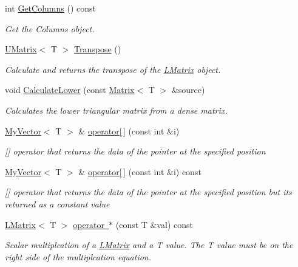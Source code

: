 \begin{DoxyCompactItemize}
int \mbox{\hyperlink{class_l_matrix_ae7adc0f92e3648751fe49852ad158ea2}{Get\+Columns}} () const
\begin{DoxyCompactList}\small\item\em Get the Columns object. \end{DoxyCompactList}\item 
\mbox{\hyperlink{class_u_matrix}{U\+Matrix}}$<$ T $>$ \mbox{\hyperlink{class_l_matrix_afe89d1c0c91d284ff0277da586dc667a}{Transpose}} ()
\begin{DoxyCompactList}\small\item\em Calculate and returns the transpose of the \mbox{\hyperlink{class_l_matrix}{L\+Matrix}} object. \end{DoxyCompactList}\item 
void \mbox{\hyperlink{class_l_matrix_a9a70080e771867dd76c983fe1f8c2c15}{Calculate\+Lower}} (const \mbox{\hyperlink{class_matrix}{Matrix}}$<$ T $>$ \&source)
\begin{DoxyCompactList}\small\item\em Calculates the lower triangular matrix from a dense matrix. \end{DoxyCompactList}\item 
\mbox{\hyperlink{class_my_vector}{My\+Vector}}$<$ T $>$ \& \mbox{\hyperlink{class_l_matrix_a7eab2a6c57437448d21a04484844e359}{operator\mbox{[}$\,$\mbox{]}}} (const int \&i)
\begin{DoxyCompactList}\small\item\em \mbox{[}\mbox{]} operator that returns the data of the pointer at the specified position \end{DoxyCompactList}\item 
\mbox{\hyperlink{class_my_vector}{My\+Vector}}$<$ T $>$ \& \mbox{\hyperlink{class_l_matrix_a56ec5ba9be0bb900ddc0ee7c5283bccd}{operator\mbox{[}$\,$\mbox{]}}} (const int \&i) const
\begin{DoxyCompactList}\small\item\em \mbox{[}\mbox{]} operator that returns the data of the pointer at the specified position but its returned as a constant value \end{DoxyCompactList}\item 
\mbox{\hyperlink{class_l_matrix}{L\+Matrix}}$<$ T $>$ \mbox{\hyperlink{class_l_matrix_ac8df9082c434b41a98d26defb95ea388}{operator $\ast$}} (const T \&val) const
\begin{DoxyCompactList}\small\item\em Scalar multiplcation of a \mbox{\hyperlink{class_l_matrix}{L\+Matrix}} and a T value. The T value must be on the right side of the multiplcation equation. \end{DoxyCompactList}\item 

\end{DoxyCompactItemize}
